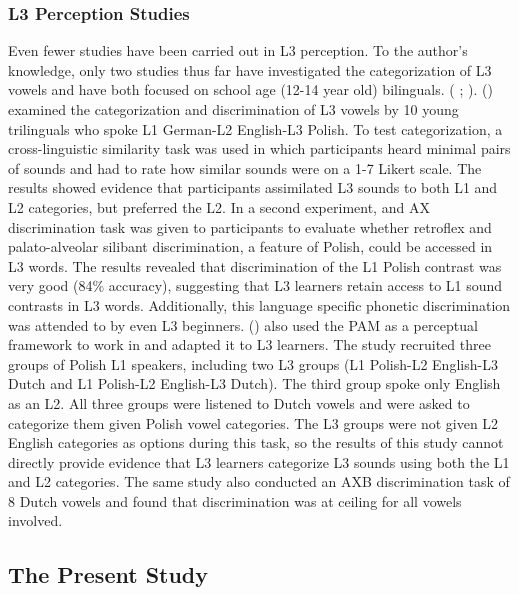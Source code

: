 \documentclass[preprints]{Definitions/mdpi}
\begin{document}
\hypertarget{l3-perception-studies}{%
\subsubsection{L3 Perception Studies}\label{l3-perception-studies}}

Even fewer studies have been carried out in L3 perception.
To the author's knowledge, only two studies thus far have investigated the categorization of L3 vowels and have both focused on school age (12-14 year old) bilinguals. (\citeauthor{balas_non-native_2018} \citeyear{balas_non-native_2018}; \citeauthor{wrembel_extending_2019} \citeyear{wrembel_extending_2019}).
\citeauthor{wrembel_extending_2019} (\citeyear{wrembel_extending_2019}) examined the categorization and discrimination of L3 vowels by 10 young trilinguals who spoke L1 German-L2 English-L3 Polish.
To test categorization, a cross-linguistic similarity task was used in which participants heard minimal pairs of sounds and had to rate how similar sounds were on a 1-7 Likert scale.
The results showed evidence that participants assimilated L3 sounds to both L1 and L2 categories, but preferred the L2.
In a second experiment, and AX discrimination task was given to participants to evaluate whether retroflex and palato-alveolar silibant discrimination, a feature of Polish, could be accessed in L3 words.
The results revealed that discrimination of the L1 Polish contrast was very good (84\% accuracy), suggesting that L3 learners retain access to L1 sound contrasts in L3 words.
Additionally, this language specific phonetic discrimination was attended to by even L3 beginners.
\citeauthor{balas_non-native_2018} (\citeyear{balas_non-native_2018}) also used the PAM as a perceptual framework to work in and adapted it to L3 learners.
The study recruited three groups of Polish L1 speakers, including two L3 groups (L1 Polish-L2 English-L3 Dutch and L1 Polish-L2 English-L3 Dutch).
The third group spoke only English as an L2.
All three groups were listened to Dutch vowels and were asked to categorize them given Polish vowel categories.
The L3 groups were not given L2 English categories as options during this task, so the results of this study cannot directly provide evidence that L3 learners categorize L3 sounds using both the L1 and L2 categories.
The same study also conducted an AXB discrimination task of 8 Dutch vowels and found that discrimination was at ceiling for all vowels involved.

\hypertarget{the-present-study}{%
\subsection{The Present Study}\label{the-present-study}}
\end{document}
